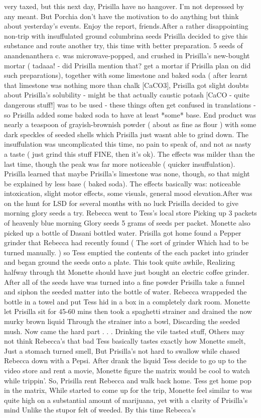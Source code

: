 \documentclass[12pt]{book}
\begin{document}
very taxed, but this next day, Prisilla have no hangover. I'm not depressed by any meant. But Porchia don't have the motivation to do anything but think about yesterday's events. Enjoy the report, friends.After a rather disappointing non-trip with insuffulated ground columbrina seeds Prisilla decided to give this substance and route another try, this time with better preparation. 5 seeds of anandenanthera c. was microwave-popped, and crushed in Prisilla's new-bought mortar ( tadaaa! - did Prisilla mention that? get a mortar if Prisilla plan on did such preparations), together with some limestone and baked soda ( after learnt that limestone was nothing more than chalk [CaCO3], Prisilla got slight doubts about Prisilla's solubility - might be that actually caustic potash [CaCO - quite dangerous stuff!] was to be used - these things often get confused in translations - so Prisilla added some baked soda to have at least *some* base. End product was nearly a teaspoon of grayish-brownish powder ( about as fine as flour ) with some dark speckles of seeded shells which Prisilla just wasnt able to grind down. The insuffulation was uncomplicated this time, no pain to speak of, and not as nasty a taste ( just grind this stuff FINE, then it's ok). The effects was milder than the last time, though the peak was far more noticeable ( quicker insuffulation). Prisilla learned that maybe Prisilla's limestone was none, though, so that might be explained by less base ( baked soda). The effects basically was: noticeable intoxication, slight motor effects, some visuals, general mood elevation.After was on the hunt for LSD for several months with no luck Prisilla decided to give morning glory seeds a try. Rebecca went to Tess's local store Picking up 3 packets of heavenly blue morning Glory seeds 5 grams of seeds per packet. Monette also picked up a bottle of Dasani bottled water. Prisilla got home found a Pepper grinder that Rebecca had recently found ( The sort of grinder Which had to be turned manually. ) so Tess emptied the contents of the each packet into grinder and began ground the seeds onto a plate. This took quite awhile, Realizing halfway through tht Monette should have just bought an electric coffee grinder. After all of the seeds have was turned into a fine powder Prisilla take a funnel and siphon the seeded matter into the bottle of water. Rebecca wrappeded the bottle in a towel and put Tess hid in a box in a completely dark room. Monette let Prisilla sit for 45-60 mins then took a spaghetti strainer and drained the now murky brown liquid Through the strainer into a bowl, Discarding the seeded mush. Now came the hard part . . .  Drinking the vile tasted stuff, Others may not think Rebecca's that bad Tess basically tastes exactly how Monette smelt, Just a stomach turned smell, But Prisilla's not hard to swallow while chased Rebecca down with a Pepsi. After drank the liquid Tess decide to go up to the video store and rent a movie, Monette figure the matrix would be cool to watch while trippin'. So, Prisilla rent Rebecca and walk back home. Tess get home pop in the matrix, While started to come up for the trip, Monette feel similar to was quite high on a substantial amount of marijuana, yet with a clarity of Prisilla's mind Unlike the stupor felt of weeded. By this time Rebecca's 
\end{document}
